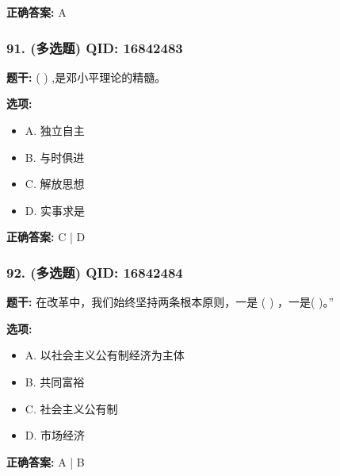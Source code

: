 \documentclass[12pt,UTF8]{ctexart}
\begin{document}
\textbf{正确答案:}
A

\vspace{0.3em}\hrulefill\vspace{0.7em}

\subsubsection*{91. (多选题) \small QID: 16842483}

\textbf{题干:}
( ) ,是邓小平理论的精髓。

\textbf{选项:}
\begin{itemize}[leftmargin=*]

  \item A. 独立自主

  \item B. 与时俱进

  \item C. 解放思想

  \item D. 实事求是

\end{itemize}

\textbf{正确答案:}
C | D

\vspace{0.3em}\hrulefill\vspace{0.7em}

\subsubsection*{92. (多选题) \small QID: 16842484}

\textbf{题干:}
在改革中，我们始终坚持两条根本原则，一是 ( ) ，一是( )。”

\textbf{选项:}
\begin{itemize}[leftmargin=*]

  \item A. 以社会主义公有制经济为主体

  \item B. 共同富裕

  \item C. 社会主义公有制

  \item D. 市场经济

\end{itemize}

\textbf{正确答案:}
A | B

\vspace{0.3em}\hrulefill\vspace{0.7em}
\end{document}
